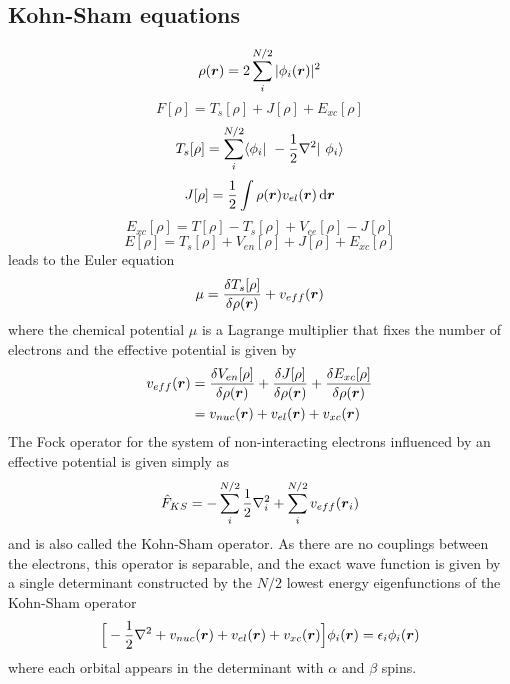 \subsection{Kohn-Sham equations}
\begin{equation}
    \rho(\boldsymbol r) = 2 \sum_i^{N/2} | \phi_i(\boldsymbol r)|^2
\end{equation}
\begin{equation}
    F[\rho] = T_s[\rho] + J[\rho] + E_{xc}[\rho]
\end{equation}
\begin{equation}
    T_s[\rho] = \sum_i^{N/2} \langle \orbital_i | -\frac{1}{2}\nabla^2 | \orbital_i \rangle
\end{equation}
\begin{equation}
    J[\rho] = \frac{1}{2} \int \rho(\boldsymbol r)v_{el}(\boldsymbol r) \,\mathrm{d} \boldsymbol r
\end{equation}
\begin{equation}
    E_{xc}[\rho] = T[\rho] - T_s[\rho] + V_{ee}[\rho] - J[\rho]
\end{equation}
\begin{equation}
    \label{eq:KS-energy}
    E[\rho] = T_s[\rho] + V_{en}[\rho] + J[\rho] + E_{xc}[\rho]
\end{equation}
leads to the Euler equation
\begin{equation}
    \mu = \frac{\delta T_s[\rho]}{\delta \rho(\boldsymbol r)} + v_{eff}(\boldsymbol r)
\end{equation}
where the chemical potential $\mu$ is a Lagrange multiplier that fixes the number of 
electrons and the effective potential is given by
\begin{align}
    v_{eff}(\boldsymbol r) 
	&= \frac{\delta V_{en}[\rho]}{\delta \rho(\boldsymbol r)}
	+ \frac{\delta J[\rho]}{\delta \rho(\boldsymbol r)}
	+ \frac{\delta E_{xc}[\rho]}{\delta \rho(\boldsymbol r)}\\
	&= v_{nuc}(\boldsymbol r) + v_{el}(\boldsymbol r) + v_{xc}(\boldsymbol r)
\end{align}
The Fock operator for the system of non-interacting electrons influenced by an effective
potential is given simply as
\begin{equation}
    \hat{F}_{KS} = -\sum_i^{N/2} \frac{1}{2}\nabla_i^2 + \sum_i^{N/2} v_{eff}(\boldsymbol r_i)
\end{equation}
and is also called the Kohn-Sham operator. As there are no couplings between the electrons, 
this operator is separable, and the exact wave function is given by a single determinant 
constructed by the $N/2$ lowest energy eigenfunctions of the Kohn-Sham operator
\begin{equation}
    \Big[-\frac{1}{2}\nabla^2 + v_{nuc}(\boldsymbol r) + v_{el}(\boldsymbol r) + v_{xc}(\boldsymbol r)\Big] 
	\phi_i(\boldsymbol r) = \epsilon_i \phi_i(\boldsymbol r)
\end{equation}
where each orbital appears in the determinant with $\alpha$ and $\beta$ spins.

